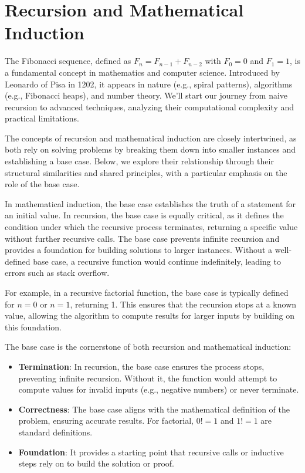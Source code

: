 \documentclass{article}
\begin{document}
\clearpage %

\section{Recursion and Mathematical Induction}
The Fibonacci sequence, defined as $F_n = F_{n-1} + F_{n-2}$ with $F_0 = 0$ and $F_1 = 1$, is a fundamental concept in mathematics and computer science. Introduced by Leonardo of Pisa in 1202, it appears in nature (e.g., spiral patterns), algorithms (e.g., Fibonacci heaps), and number theory. We'll start our journey from naive recursion to advanced techniques, analyzing their computational complexity and practical limitations.

The concepts of recursion and mathematical induction are closely intertwined, as both rely on solving problems by breaking them down into smaller instances and establishing a base case. Below, we explore their relationship through their structural similarities and shared principles, with a particular emphasis on the role of the base case.

In mathematical induction, the base case establishes the truth of a statement for an initial value. In recursion, the base case is equally critical, as it defines the condition under which the recursive process terminates, returning a specific value without further recursive calls. The base case prevents infinite recursion and provides a foundation for building solutions to larger instances. Without a well-defined base case, a recursive function would continue indefinitely, leading to errors such as stack overflow.

For example, in a recursive factorial function, the base case is typically defined for \( n = 0 \) or \( n = 1 \), returning 1. This ensures that the recursion stops at a known value, allowing the algorithm to compute results for larger inputs by building on this foundation.

The base case is the cornerstone of both recursion and mathematical induction:
\begin{itemize}
	\item \textbf{Termination}: In recursion, the base case ensures the process stops, preventing infinite recursion. Without it, the function would attempt to compute values for invalid inputs (e.g., negative numbers) or never terminate.
	\item \textbf{Correctness}: The base case aligns with the mathematical definition of the problem, ensuring accurate results. For factorial, \( 0! = 1 \) and \( 1! = 1 \) are standard definitions.
	\item \textbf{Foundation}: It provides a starting point that recursive calls or inductive steps rely on to build the solution or proof.
\end{itemize}
\end{document}
